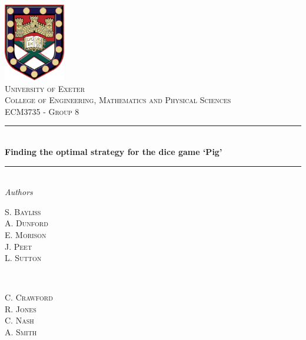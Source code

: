 \documentclass[a4paper,titlepage]{article}
\begin{document}
\begin{titlepage}
	\newcommand{\HRule}{\rule{\linewidth}{0.5mm}}
	\center
	
	
	\includegraphics[width=0.2\textwidth]{Crest.jpg}\\[1cm]
	
	
	\textsc{\LARGE University of Exeter}\\[1.5cm] 
	
	\textsc{\Large College of Engineering, Mathematics and Physical Sciences}\\[0.5cm] 
	
	\textsc{\large ECM3735 - Group 8}\\[0.5cm]
	
	
	\HRule\\[0.4cm]
	
	{\huge\bfseries Finding the optimal strategy for the dice game `Pig'}\\[0.4cm]
	
	\HRule\\[1.5cm]
	
	
	\LARGE\textit{Authors}\\
	\begin{minipage}{0.4\textwidth}
		\begin{flushleft}
			\large
			S. \textsc{Bayliss}\\
			A. \textsc{Dunford}\\
			E. \textsc{Morison}\\
			J. \textsc{Peet}\\
			L. \textsc{Sutton}
		\end{flushleft}
	\end{minipage}
	~
	\begin{minipage}{0.4\textwidth}
		\begin{flushright}
			\large
			C. \textsc{Crawford}\\
			R. \textsc{Jones}\\
			C. \textsc{Nash}\\
			A. \textsc{Smith}
			\vspace*{10pt§}
		\end{flushright}
	\end{minipage}
	

\end{titlepage}
\end{document}
